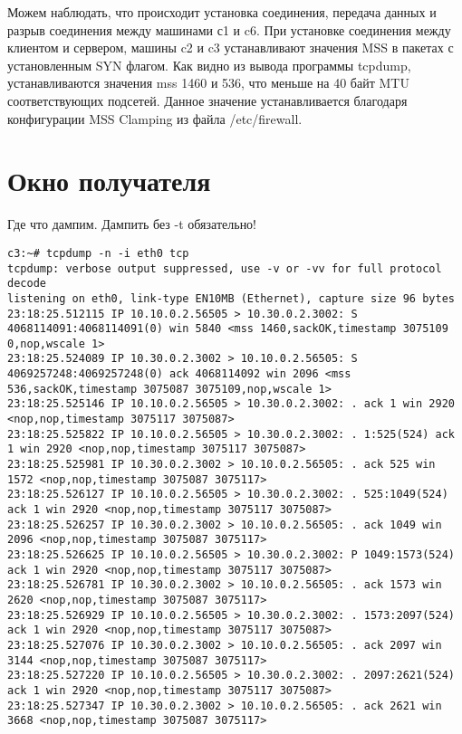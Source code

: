\documentclass[a4paper,12pt]{article}
\begin{document}
Можем наблюдать, что происходит установка соединения, передача данных и разрыв соединения между машинами с1 и c6. При установке соединения между клиентом и сервером, машины c2 и c3 устанавливают значения MSS в пакетах с установленным SYN флагом. Как видно из вывода программы tcpdump, устанавливаются значения mss 1460 и 536, что меньше на 40 байт MTU соответствующих подсетей. Данное значение устанавливается благодаря конфигурации MSS Clamping из файла /etc/firewall. 

\section{Окно получателя}

Где что дампим.  Дампить без -t обязательно!

\begin{Verbatim}
c3:~# tcpdump -n -i eth0 tcp
tcpdump: verbose output suppressed, use -v or -vv for full protocol decode
listening on eth0, link-type EN10MB (Ethernet), capture size 96 bytes
23:18:25.512115 IP 10.10.0.2.56505 > 10.30.0.2.3002: S 4068114091:4068114091(0) win 5840 <mss 1460,sackOK,timestamp 3075109 0,nop,wscale 1>
23:18:25.524089 IP 10.30.0.2.3002 > 10.10.0.2.56505: S 4069257248:4069257248(0) ack 4068114092 win 2096 <mss 536,sackOK,timestamp 3075087 3075109,nop,wscale 1>
23:18:25.525146 IP 10.10.0.2.56505 > 10.30.0.2.3002: . ack 1 win 2920 <nop,nop,timestamp 3075117 3075087>
23:18:25.525822 IP 10.10.0.2.56505 > 10.30.0.2.3002: . 1:525(524) ack 1 win 2920 <nop,nop,timestamp 3075117 3075087>
23:18:25.525981 IP 10.30.0.2.3002 > 10.10.0.2.56505: . ack 525 win 1572 <nop,nop,timestamp 3075087 3075117>
23:18:25.526127 IP 10.10.0.2.56505 > 10.30.0.2.3002: . 525:1049(524) ack 1 win 2920 <nop,nop,timestamp 3075117 3075087>
23:18:25.526257 IP 10.30.0.2.3002 > 10.10.0.2.56505: . ack 1049 win 2096 <nop,nop,timestamp 3075087 3075117>
23:18:25.526625 IP 10.10.0.2.56505 > 10.30.0.2.3002: P 1049:1573(524) ack 1 win 2920 <nop,nop,timestamp 3075117 3075087>
23:18:25.526781 IP 10.30.0.2.3002 > 10.10.0.2.56505: . ack 1573 win 2620 <nop,nop,timestamp 3075087 3075117>
23:18:25.526929 IP 10.10.0.2.56505 > 10.30.0.2.3002: . 1573:2097(524) ack 1 win 2920 <nop,nop,timestamp 3075117 3075087>
23:18:25.527076 IP 10.30.0.2.3002 > 10.10.0.2.56505: . ack 2097 win 3144 <nop,nop,timestamp 3075087 3075117>
23:18:25.527220 IP 10.10.0.2.56505 > 10.30.0.2.3002: . 2097:2621(524) ack 1 win 2920 <nop,nop,timestamp 3075117 3075087>
23:18:25.527347 IP 10.30.0.2.3002 > 10.10.0.2.56505: . ack 2621 win 3668 <nop,nop,timestamp 3075087 3075117>

\end{Verbatim}
\end{document}
